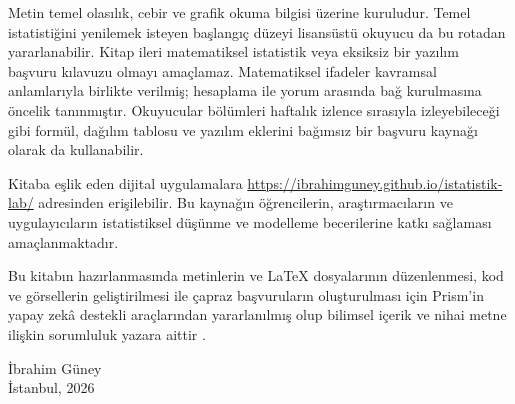 Metin temel olasılık, cebir ve grafik okuma bilgisi üzerine kuruludur.
Temel istatistiğini yenilemek isteyen başlangıç düzeyi lisansüstü okuyucu
da bu rotadan yararlanabilir. Kitap ileri matematiksel istatistik veya
eksiksiz bir yazılım başvuru kılavuzu olmayı amaçlamaz.
Matematiksel ifadeler kavramsal anlamlarıyla birlikte verilmiş;
hesaplama ile yorum arasında bağ kurulmasına öncelik tanınmıştır. Okuyucular
bölümleri haftalık izlence sırasıyla izleyebileceği gibi formül, dağılım
tablosu ve yazılım eklerini bağımsız bir başvuru kaynağı olarak da
kullanabilir.

Kitaba eşlik eden dijital uygulamalara \url{https://ibrahimguney.github.io/istatistik-lab/} adresinden erişilebilir. Bu kaynağın öğrencilerin, araştırmacıların ve uygulayıcıların istatistiksel düşünme ve modelleme becerilerine katkı sağlaması amaçlanmaktadır.

Bu kitabın hazırlanmasında metinlerin ve LaTeX dosyalarının düzenlenmesi,
kod ve görsellerin geliştirilmesi ile çapraz başvuruların oluşturulması için
Prism'in yapay zekâ destekli araçlarından yararlanılmış olup bilimsel içerik
ve nihai metne ilişkin sorumluluk yazara aittir \citep{openai2026prism}.

\begin{flushright}
İbrahim Güney\\
İstanbul, 2026
\end{flushright}